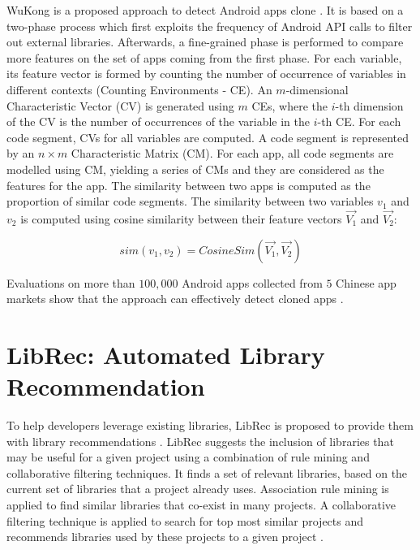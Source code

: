 WuKong is a proposed approach to detect Android apps clone \cite{Wang:2015:WSA:2771783.2771795}. It is based on a two-phase process which first exploits the frequency of Android API calls to filter out external libraries. Afterwards, a fine-grained phase is performed to compare more features on the set of apps coming from the first phase. For each variable, its feature vector is formed by counting the number of occurrence of variables in different contexts (Counting Environments - CE). An $m$-dimensional Characteristic Vector (CV) is generated using $m$ CEs, where the $i$-th dimension of the CV is the number of occurrences of the variable in the $i$-th CE. For each code segment, CVs for all variables are computed. A code segment is represented by an $n \times m$ Characteristic Matrix (CM). For each app, all code segments are modelled using CM, yielding a series of CMs and they are considered as the features for the app. The similarity between two apps is computed as the proportion of similar code segments. The similarity between two variables $v_{1}$ and $v_{2}$ is computed using cosine similarity between their feature vectors $\vec{V_{1}}$ and $\vec{V_{2}}$:

\begin{equation}
sim(v_{1},v_{2}) = CosineSim(\vec{V_{1}},\vec{V_{2}})%
\end{equation}

Evaluations on more than $100,000$ Android apps collected from $5$ Chinese app markets show that the approach can effectively detect cloned apps \cite{Wang:2015:WSA:2771783.2771795}. 


\section{LibRec: Automated Library Recommendation}\label{sec:librec}

To help developers leverage existing libraries, LibRec is proposed to provide them with library recommendations \cite{6671293}. LibRec suggests the inclusion of libraries that may be useful for a given project using a combination of rule mining and collaborative filtering techniques. It finds a set of relevant libraries, based on the current set of libraries that a project already uses. Association rule mining is applied to find similar libraries that co-exist in many projects. A collaborative filtering technique is applied to search for top most similar projects and recommends libraries used by these projects to a given project \cite{6671293}.

